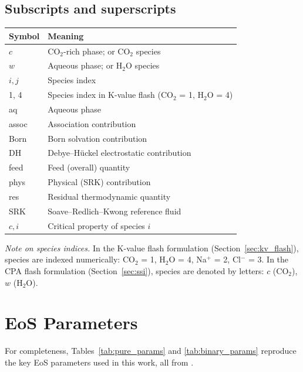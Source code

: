 \documentclass[preprint,12pt,authoryear]{elsarticle}
\begin{document}
\subsection*{Subscripts and superscripts}

\begin{tabular}{@{}ll@{}}
  \toprule
  Symbol & Meaning \\
  \midrule
  $c$ & CO$_2$-rich phase; or CO$_2$ species \\
  $w$ & Aqueous phase; or H$_2$O species \\
  $i, j$ & Species index \\
  1, 4 & Species index in K-value flash (CO$_2$ = 1, H$_2$O = 4) \\
  aq & Aqueous phase \\
  assoc & Association contribution \\
  Born & Born solvation contribution \\
  DH & Debye--Hückel electrostatic contribution \\
  feed & Feed (overall) quantity \\
  phys & Physical (SRK) contribution \\
  res & Residual thermodynamic quantity \\
  SRK & Soave--Redlich--Kwong reference fluid \\
  $c, i$ & Critical property of species $i$ \\
  \bottomrule
\end{tabular}

\bigskip
\noindent\textit{Note on species indices.}
In the K-value flash formulation (Section~\ref{sec:kv_flash}),
species are indexed numerically: CO$_2$ = 1, H$_2$O = 4, Na$^+$ = 2, Cl$^-$ = 3.
In the CPA flash formulation (Section~\ref{sec:ssi}),
species are denoted by letters: $c$ (CO$_2$), $w$ (H$_2$O).

\section{EoS Parameters}
\label{sec:params}

For completeness, Tables~\ref{tab:pure_params} and \ref{tab:binary_params} reproduce the
key EoS parameters used in this work, all from \citet{Coelho2025}.
\end{document}

